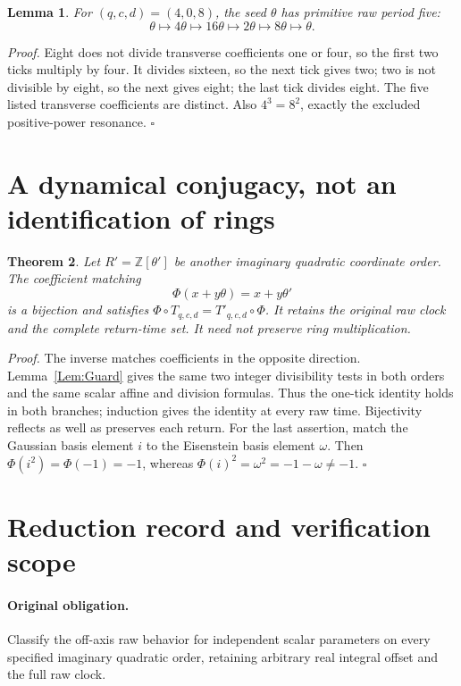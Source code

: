 \documentclass[11pt,letterpaper]{article}
\newcommand{\Z}{\mathbb{Z}}
\newtheorem{theorem}{Theorem}
\newtheorem{lemma}[theorem]{Lemma}
\newenvironment{proof}{\noindent\textit{Proof.}}{\hfill\(\square\)}
\begin{document}
\begin{lemma}\label{Lem:Dependent}
For \((q,c,d)=(4,0,8)\), the seed \(\theta\) has primitive raw period five:
\[
\theta\longmapsto4\theta\longmapsto16\theta
\longmapsto2\theta\longmapsto8\theta\longmapsto\theta.
\]
\end{lemma}
\begin{proof}
Eight does not divide transverse coefficients one or four, so the first
two ticks multiply by four. It divides sixteen, so the next tick gives
two; two is not divisible by eight, so the next gives eight; the last tick
divides eight. The five listed transverse coefficients are distinct.
Also \(4^3=8^2\), exactly the excluded positive-power resonance.
\end{proof}

\section{A dynamical conjugacy, not an identification of rings}

\begin{theorem}\label{Thm:Transfer}
Let \(R'=\Z[\theta']\) be another imaginary quadratic coordinate order.
The coefficient matching
\[
\Phi(x+y\theta)=x+y\theta'
\]
is a bijection and satisfies
\(\Phi\circ T_{q,c,d}=T'_{q,c,d}\circ\Phi\).
It retains the original raw clock and the complete return-time set.
It need not preserve ring multiplication.
\end{theorem}
\begin{proof}
The inverse matches coefficients in the opposite direction.
Lemma~\ref{Lem:Guard} gives the same two integer divisibility tests in
both orders and the same scalar affine and division formulas. Thus the
one-tick identity holds in both branches; induction gives the identity
at every raw time. Bijectivity reflects as well as preserves each return.
For the last assertion, match the Gaussian basis element \(i\) to the
Eisenstein basis element \(\omega\). Then
\(\Phi(i^2)=\Phi(-1)=-1\), whereas
\(\Phi(i)^2=\omega^2=-1-\omega\ne-1\).
\end{proof}

\section{Reduction record and verification scope}

\paragraph{Original obligation.}
Classify the off-axis raw behavior for independent scalar parameters on
every specified imaginary quadratic order, retaining arbitrary real
integral offset and the full raw clock.
\end{document}
